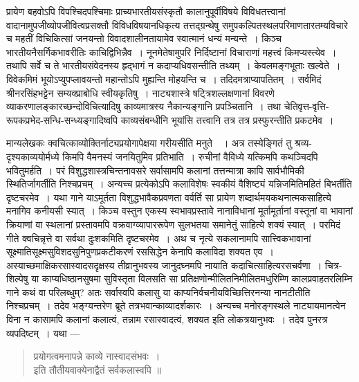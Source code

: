 {\dev प्रायेण बहवोऽपि विपश्चिदपश्चिमाः प्राच्यभारतीयसंस्कृतौ कालानुपूर्वीविषये विविधतत्त्वानां वादानामुपजीव्योपजीवित्वप्रसक्तौ विविधविषयानधिकृत्य तत्तद्ग्रन्थेषु समुपकल्पितस्थलपरि\-माणतारतम्यविचारे च महतीं विचिकित्सां जनयन्तो विवादशालीनतायामेव स्वात्मानं धन्यं मन्यन्ते~। किञ्च भारतीयनैसर्गिकभावरीतिः काचिद्विभिन्नैव~। नूनमेतेषामुपरि निर्दिष्टानां विचा\-राणां महत्त्वं किमप्यस्त्येव~। तथापि सर्वे च ते भारतीयसंवेदनस्य हृद्भागं न कदाप्यधिवसन्तीति तथ्यम्~। केवलमङ्गभूताः खल्वेते~। विवेकमिमं भूयोऽप्युपप्लावयन्तो महान्तोऽपि मुह्यन्ति मोहयन्ति च~। तदिदमत्राप्यापतितम्~। सर्वमिदं श्रीनरसिंहभट्टेन सम्यक्प्राबोधि स्वीयकृतिषु~। नाट्यशास्त्रे षट्त्रिशल्लक्षणानां विवरणे व्याकरणालङ्कारच्छन्दोविचित्यादिषु काव्यमात्रस्य नैका\-न्यङ्गानि प्रपञ्चितानि~। तथा चेतिवृत्त-वृत्ति-रूपकप्रभेद-सन्धि-सन्ध्यङ्गादिष्वपि काव्यसंबन्धीनि भूयांसि तत्त्वानि तत्र तत्र प्रस्फुरन्तीति प्रकटमेव~।} 

{\dev मान्यलेखकः क्वचित्काव्योक्तिर्नाट्यप्रयोगापेक्षया गरीयसीति मनुते}~{\dev~। अत्र तस्येङ्गितं तु श्रव्य-दृश्यकाव्ययोर्मध्ये किमपि वैमनस्यं जनयितुमिव प्रतिभाति~। रुचीनां वैविध्ये यत्किमपि कथञ्चिदपि भवितुमर्हति~। परं विशुद्धशास्त्रचिन्तनावसरे सर्वासामपि कलानां तत्तन्मात्रा कापि सार्वभौमिकी स्थितिर्जागर्तीति निश्चप्रचम्~। अन्यच्च प्रत्येकोऽपि कलाविशेषः स्वकीयं वैशिष्ट्यं यन्निजमितिमहितं बिभर्तीति दृष्टचरमेव~। यथा गाने याऽमूर्तता  विशुद्धभावैकप्रवणता वर्वर्ति सा प्रायेण शब्दार्थमयकथनात्मकसाहित्ये मनागिव कनीयसी स्यात्~। किञ्च वस्तुन एकस्य स्वभावप्रस्तावे नानाविधानां मूर्तामूर्तानां वस्तूनां वा भावानां क्रियाणां वा स्थलानां प्रस्तावमपि वक्रवाग्व्यापाररूपेण सुलभतया समानेतुं साहित्ये शक्यं स्यात्~। परमिदं गीते क्वचिन्नृत्ते वा सर्वथा दुःशकमिति दृष्टचरमेव~। अथ च नृत्ये सकलानामपि सात्त्विकभावानां सूक्ष्मातिसूक्ष्मसुविशदसुनिपुणप्रकटीकरणं रससिद्धेन केनापि कलाविदा शक्यत एव~। अस्याच्छमाक्षिकरसास्वादसदृक्षस्य तीव्रानुभवस्य जानुदघ्नमपि नायाति कदाचित्साहित्यरसचर्वणा~। चित्र-शिल्पेषु या काप्यधिष्ठानसुषमा सुविस्तृता विलसति सा प्रतिक्षणोन्मीलितनिमीलितमधुरिम्णि कालप्रवाहतरलिम्नि गाने कथं वा परिलब्धुम्? अतः सर्वास्वपि कलासु या काप्यनिर्वचनीयविच्छित्तिरनन्या नानटीतीति निश्चप्रचम्~। तदेव भङ्ग्यन्तरेण ब्रूते तत्रभवान्काव्यादर्शकारः~। अन्यच्च मनोरङ्गस्थले नाट्यायमानत्वेन विना न कासामपि कलानां कलात्वं, तन्नाम रसास्वादत्वं, शक्यत इति लोकत्रयानुभवः~। तदेव पुनरत्र व्यपदिष्टम्~। यथा ---} 
\begin{quote}
{\dev प्रयोगत्वमनापन्ने काव्ये नास्वादसंभवः~।}\\
{\dev इति तौतीयवाक्येनाद्वैतं सर्वकलास्वपि ॥}
\end{quote}


